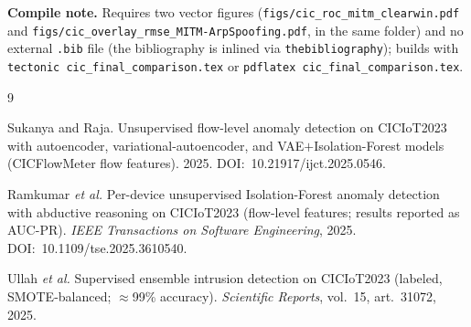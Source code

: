 \documentclass[11pt]{article}
\begin{document}
\bigskip
\noindent\textbf{Compile note.} Requires two vector figures
(\texttt{figs/cic\_roc\_mitm\_clearwin.pdf} and
\texttt{figs/cic\_overlay\_rmse\_MITM-ArpSpoofing.pdf}, in the same folder) and no external
\texttt{.bib} file (the bibliography is inlined via \texttt{thebibliography}); builds with
\texttt{tectonic cic\_final\_comparison.tex} or \texttt{pdflatex cic\_final\_comparison.tex}.

\begin{thebibliography}{9}

Sukanya and Raja. Unsupervised flow-level anomaly detection on CICIoT2023 with autoencoder,
variational-autoencoder, and VAE${+}$Isolation-Forest models (CICFlowMeter flow features). 2025.
DOI:~10.21917/ijct.2025.0546.

Ramkumar \emph{et al.} Per-device unsupervised Isolation-Forest anomaly detection with abductive
reasoning on CICIoT2023 (flow-level features; results reported as AUC-PR). \emph{IEEE Transactions on
Software Engineering}, 2025. DOI:~10.1109/tse.2025.3610540.

Ullah \emph{et al.} Supervised ensemble intrusion detection on CICIoT2023 (labeled, SMOTE-balanced;
$\approx$99\% accuracy). \emph{Scientific Reports}, vol.~15, art.~31072, 2025.

\end{thebibliography}
\end{document}
